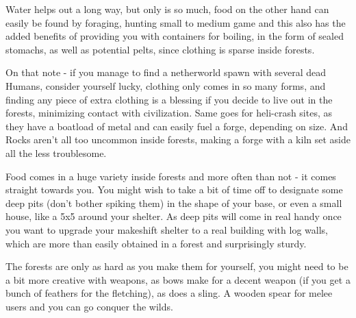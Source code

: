 Water helps out a long way, but only is so much, food on the other hand can easily be found by foraging, hunting small to medium game and this also has the added benefits of providing you with containers for boiling, in the form of sealed stomachs, as well as potential pelts, since clothing is sparse inside forests.

On that note - if you manage to find a netherworld spawn with several dead Humans, consider yourself lucky, clothing only comes in so many forms, and finding any piece of extra clothing is a blessing if you decide to live out in the forests, minimizing contact with civilization.
Same goes for heli-crash sites, as they have a boatload of metal and can easily fuel a forge, depending on size. And Rocks aren't all too uncommon inside forests, making a forge with a kiln set aside all the less troublesome.

Food comes in a huge variety inside forests and more often than not - it comes straight towards you. You might wish to take a bit of time off to designate some deep pits (don't bother spiking them) in the shape of your base, or even a small house, like a 5x5 around your shelter. As deep pits will come in real handy once you want to upgrade your makeshift shelter to a real building with log walls, which are more than easily obtained in a forest and surprisingly sturdy.

The forests are only as hard as you make them for yourself, you might need to be a bit more creative with weapons, as bows make for a decent weapon (if you get a bunch of feathers for the fletching), as does a sling. A wooden spear for melee users and you can go conquer the wilds.